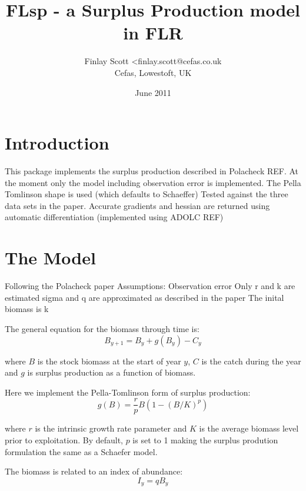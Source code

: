 \documentclass[a4paper]{article}
\begin{document}
\title{FLsp - a Surplus Production model in FLR}
\author{ Finlay Scott <finlay.scott@cefas.co.uk\\
Cefas, Lowestoft, UK}
\date{June 2011}
\maketitle

\section{Introduction}

This package implements the surplus production described in Polacheck REF.
At the moment only the model including observation error is implemented.
The Pella Tomlinson shape is used (which defaults to Schaeffer)
Tested against the three data sets in the paper.
Accurate gradients and hessian are returned using automatic differentiation (implemented using ADOLC REF)

\section{The Model}
Following the Polacheck paper
Assumptions:
Observation error
Only r and k are estimated
sigma and q are approximated as described in the paper
The inital biomass is k

The general equation for the biomass through time is:
\begin{equation}
B_{y+1} = B_y + g(B_y) - C_y
\end{equation}

where $B$ is the stock biomass at the start of year $y$, $C$ is the catch during the year and $g$ is surplus production as a function of biomass.

Here we implement the Pella-Tomlinson form of surplus production:
\begin{equation}
g(B) = \frac{r}{p} B(1-(B/K)^p)
\end{equation}

where $r$ is the intrinsic growth rate parameter and $K$ is the average biomass level prior to exploitation.
By default, $p$ is set to 1 making the surplus prodution formulation the same as a Schaefer model.

The biomass is related to an index of abundance:
\begin{equation}
I_y = q B_y
\end{equation}
\end{document}
